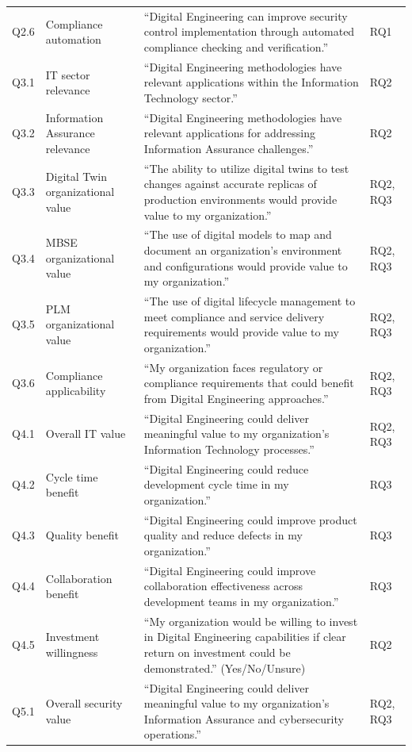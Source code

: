 {\begin{longtable}{@{}l p{2.9cm} p{7.5cm} l@{}}
Q2.6 & Compliance automation & ``Digital Engineering can improve security control implementation through automated compliance checking and verification.'' & RQ1 \\
Q3.1 & IT sector relevance & ``Digital Engineering methodologies have relevant applications within the Information Technology sector.'' & RQ2 \\
Q3.2 & Information Assurance relevance & ``Digital Engineering methodologies have relevant applications for addressing Information Assurance challenges.'' & RQ2 \\
Q3.3 & Digital Twin organizational value & ``The ability to utilize digital twins to test changes against accurate replicas of production environments would provide value to my organization.'' & RQ2, RQ3 \\
Q3.4 & MBSE organizational value & ``The use of digital models to map and document an organization's environment and configurations would provide value to my organization.'' & RQ2, RQ3 \\
Q3.5 & PLM organizational value & ``The use of digital lifecycle management to meet compliance and service delivery requirements would provide value to my organization.'' & RQ2, RQ3 \\
Q3.6 & Compliance applicability & ``My organization faces regulatory or compliance requirements that could benefit from Digital Engineering approaches.'' & RQ2, RQ3 \\
Q4.1 & Overall IT value & ``Digital Engineering could deliver meaningful value to my organization's Information Technology processes.'' & RQ2, RQ3 \\
Q4.2 & Cycle time benefit & ``Digital Engineering could reduce development cycle time in my organization.'' & RQ3 \\
Q4.3 & Quality benefit & ``Digital Engineering could improve product quality and reduce defects in my organization.'' & RQ3 \\
Q4.4 & Collaboration benefit & ``Digital Engineering could improve collaboration effectiveness across development teams in my organization.'' & RQ3 \\
Q4.5 & Investment willingness & ``My organization would be willing to invest in Digital Engineering capabilities if clear return on investment could be demonstrated.'' (Yes/No/Unsure) & RQ2 \\
Q5.1 & Overall security value & ``Digital Engineering could deliver meaningful value to my organization's Information Assurance and cybersecurity operations.'' & RQ2, RQ3 \\

\end{longtable}}
